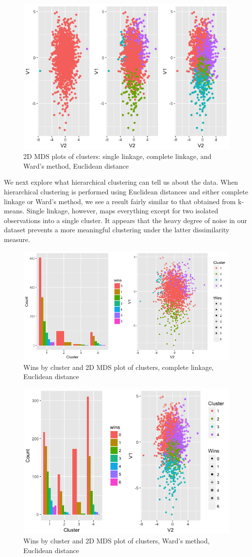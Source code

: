 \documentclass[10pt,a4paper, hidelinks]{article} %
\begin{document}
\begin{figure}[H]
	\centering
	\includegraphics[width=0.7\linewidth]{../fig/areyouheigh}
		\caption{2D MDS plots of clusters: single linkage, complete linkage, and Ward's method, Euclidean distance}
\end{figure}

We next explore what hierarchical clustering can tell us about the data. When hierarchical clustering is performed using Euclidean distances and either complete linkage or Ward's method, we see a result fairly similar to that obtained from k-means.  Single linkage, however, maps everything except for two isolated observations into a single cluster. It appears that the heavy degree of noise in our dataset prevents a more meaningful clustering under the latter dissimilarity measure.

\begin{figure}[H]
	\centering
	\includegraphics[width=0.7\linewidth]{../fig/comp1}
		\caption{Wins by cluster and 2D MDS plot of clusters, complete linkage, Euclidean distance}
\end{figure}

\begin{figure}[H]
	\centering
	\includegraphics[width=0.7\linewidth]{../fig/ward1}
		\caption{Wins by cluster and 2D MDS plot of clusters, Ward's method, Euclidean distance}
\end{figure}
\end{document}
